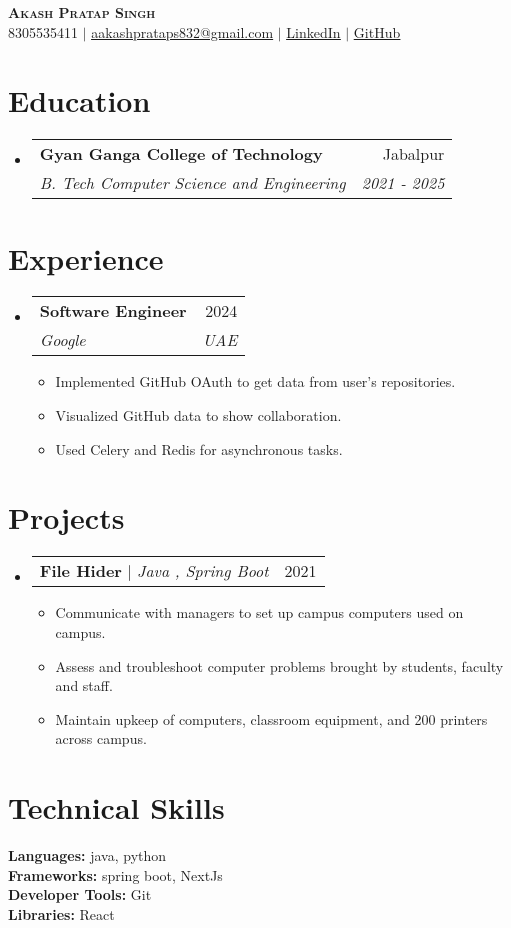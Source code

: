 \documentclass[letterpaper,11pt]{article}
\makeatletter
\newcommand{\resumeItem}[1]{
  \item\small{\small #1 \vspace{-2pt}}
}
\newcommand{\resumeProjectHeading}[2]{
  \item
    \begin{tabular*}{0.97\textwidth}[t]{l@{\extracolsep{\fill}}r}
      \small#1 & #2 \\
    \end{tabular*}\vspace{-7pt}
}
\newcommand{\resumeSubheading}[4]{
  \vspace{-2pt}\item
    \begin{tabular*}{0.97\textwidth}[t]{l@{\extracolsep{\fill}}r}
      \textbf{\small#1} & #2 \\
      \textit{\small#3} & \textit{\small #4} \\
    \end{tabular*}\vspace{-7pt}
}
\newcommand{\resumeSubHeadingListStart}{\begin{itemize}[leftmargin=0.15in, label={}]}
\newcommand{\resumeSubHeadingListEnd}{\end{itemize}}
\newcommand{\resumeItemListStart}{\begin{itemize}}
\newcommand{\resumeItemListEnd}{\end{itemize}\vspace{-5pt}}
\makeatother
\begin{document}
\begin{center}
    \textbf{\Huge \scshape Akash Pratap Singh} \\  \vspace{1pt}
    \small 8305535411 $|$ \href{mailto:aakashprataps832@gmail.com}{\underline{aakashprataps832@gmail.com}} $|$
    \href{https://www.linkedin.com/in/akashprataps/}{\underline{LinkedIn}} $|$
    \href{https://github.com/akashpratapsing}{\underline{GitHub}}
\end{center}

\section{Education}
\resumeSubHeadingListStart
  
    \resumeSubheading
      {Gyan Ganga College of Technology}{Jabalpur}
      {B. Tech Computer Science and Engineering}{2021 - 2025}
  
\resumeSubHeadingListEnd


\section{Experience}
\resumeSubHeadingListStart
  
    \resumeSubheading
      {Software Engineer}{2024}
      {Google }{UAE}
    \resumeItemListStart
      \resumeItem{Implemented GitHub OAuth to get data from user's repositories.}
\resumeItem{Visualized GitHub data to show collaboration.}
\resumeItem{Used Celery and Redis for asynchronous tasks.}  
    \resumeItemListEnd
  
\resumeSubHeadingListEnd

\section{Projects}
\resumeSubHeadingListStart
  
    \resumeProjectHeading
      {\textbf{File Hider} $|$ \emph{Java , Spring Boot}}{2021}
      \resumeItemListStart
        \resumeItem{Communicate with managers to set up campus computers used on campus.}
\resumeItem{Assess and troubleshoot computer problems brought by students, faculty and staff.}
\resumeItem{Maintain upkeep of computers, classroom equipment, and 200 printers across campus.}  
      \resumeItemListEnd
  
\resumeSubHeadingListEnd



\section{Technical Skills}
\begin{itemize}[leftmargin=0.15in, label={}]
    \small{\item{
     \textbf{Languages:} java, python \\ 
     \textbf{Frameworks:} spring boot, NextJs \\ 
     \textbf{Developer Tools:} Git \\ 
     \textbf{Libraries:} React
    }}
\end{itemize}
\end{document}
